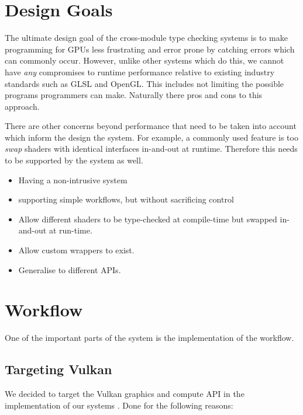 \documentclass[a4paper,12pt,twoside,openright]{report}
\begin{document}
\section{Design Goals}

The ultimate design goal of the cross-module type checking systems is to make
programming for GPUs less frustrating and error prone by catching errors which
can commonly occur. However, unlike other systems which do this, we cannot have
\textit{any} compromises to runtime performance relative to existing industry
standards such as GLSL and OpenGL. This includes not limiting the possible
programs programmers can make. Naturally there pros and cons to this approach.

There are other concerns beyond performance that need to be taken into account
which inform the design the system. For example, a commonly used feature is too
\textit{swap} shaders with identical interfaces in-and-out at runtime.
Therefore this needs to be supported by the system as well.

\begin{itemize}

    \item Having a non-intrusive system

    \item supporting simple workflows, but without sacrificing control

    \item Allow different shaders to be type-checked at compile-time but
    swapped in-and-out at run-time.

    \item Allow custom wrappers to exist.

    \item Generalise to different APIs.

\end{itemize}

\section{Workflow}

One of the important parts of the system is the implementation of the workflow.

\subsection{Targeting Vulkan}

We decided to target the Vulkan graphics and compute API in the implementation
of our systems \cite{Vulkan}. Done for the following reasons:
\end{document}
